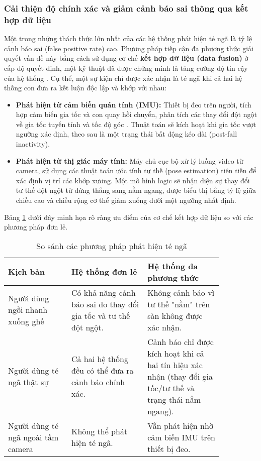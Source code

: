 \subsubsection{Cải thiện độ chính xác và giảm cảnh báo sai thông qua kết hợp dữ liệu}
Một trong những thách thức lớn nhất của các hệ thống phát hiện té ngã là tỷ lệ cảnh báo sai (false positive rate) cao. Phương pháp tiếp cận đa phương thức giải quyết vấn đề này bằng cách sử dụng cơ chế \textbf{kết hợp dữ liệu (data fusion)} ở cấp độ quyết định, một kỹ thuật đã được chứng minh là tăng cường độ tin cậy của hệ thống \cite{mdpi_data_fusion}. Cụ thể, một sự kiện chỉ được xác nhận là té ngã khi cả hai hệ thống con đưa ra kết luận độc lập và khớp với nhau:

\begin{itemize}
    \item \textbf{Phát hiện từ cảm biến quán tính (IMU):} Thiết bị đeo trên người, tích hợp cảm biến gia tốc và con quay hồi chuyển, phân tích các thay đổi đột ngột về gia tốc tuyến tính và tốc độ góc \cite{resna_imu}. Thuật toán sẽ kích hoạt khi gia tốc vượt ngưỡng xác định, theo sau là một trạng thái bất động kéo dài (post-fall inactivity).
    \item \textbf{Phát hiện từ thị giác máy tính:} Máy chủ cục bộ xử lý luồng video từ camera, sử dụng các thuật toán ước tính tư thế (pose estimation) tiên tiến để xác định vị trí các khớp xương. Một mô hình logic sẽ nhận diện sự thay đổi tư thế đột ngột từ đứng thẳng sang nằm ngang, được biểu thị bằng tỷ lệ giữa chiều cao và chiều rộng cơ thể giảm xuống dưới một ngưỡng nhất định.
\end{itemize}

Bảng \ref{tab:so_sanh_phuong_phap} dưới đây minh họa rõ ràng ưu điểm của cơ chế kết hợp dữ liệu so với các phương pháp đơn lẻ.

\begin{table}[h!]
    \centering
    \caption{So sánh các phương pháp phát hiện té ngã}
    \label{tab:so_sanh_phuong_phap}
    \begin{tabular}{|p{0.25\linewidth}|p{0.3\linewidth}|p{0.3\linewidth}|}
        \hline
        \textbf{Kịch bản} & \textbf{Hệ thống đơn lẻ} & \textbf{Hệ thống đa phương thức} \\
        \hline
        Người dùng ngồi nhanh xuống ghế & Có khả năng cảnh báo sai do thay đổi gia tốc và tư thế đột ngột. & Không cảnh báo vì tư thế "nằm" trên sàn không được xác nhận. \\
        \hline
        Người dùng té ngã thật sự & Cả hai hệ thống đều có thể đưa ra cảnh báo chính xác. & Cảnh báo chỉ được kích hoạt khi cả hai tín hiệu xác nhận (thay đổi gia tốc/tư thế và trạng thái nằm ngang). \\
        \hline
        Người dùng té ngã ngoài tầm camera & Không thể phát hiện té ngã. & Vẫn phát hiện nhờ cảm biến IMU trên thiết bị đeo. \\
        \hline
    \end{tabular}
\end{table}

